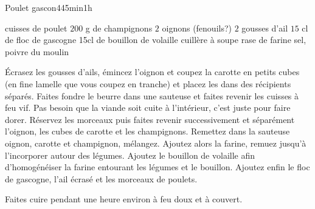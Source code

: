 \begin{recette}{Poulet gascon}{4}{45min}{1h}

\begin{ingredients}
 cuisses de poulet
\ingredient $200$ g de champignons
\ingredient $2$ oignons (fenouils?)
\ingredient $2$ gousses d'ail
\ingredient $15$ cl de floc de gascogne
\ingredient 15cl de bouillon de volaille
 cuillère à soupe rase de farine
\ingredient sel, poivre du moulin
\end{ingredients}

\begin{preparation}
\etape Écrasez les gousses d'ails, émincez l'oignon et coupez la carotte en petits cubes (en fine lamelle que vous coupez en tranche) et placez les dans des récipients séparés.
\etape Faites fondre le beurre dans une sauteuse et faites revenir les cuisses à feu vif. Pas besoin que la viande soit cuite à l'intérieur, c'est juste pour faire dorer.
\etape Réservez les morceaux puis faites revenir successivement et séparément l'oignon, les cubes de carotte et les champignons.
\etape Remettez dans la sauteuse oignon, carotte et champignon, mélangez.
\etape Ajoutez alors la farine, remuez jusqu'à l'incorporer autour des légumes.
\etape Ajoutez le bouillon de volaille afin d'homogénéiser la farine entourant les légumes et le bouillon.
\etape Ajoutez enfin le floc de gascogne, l'ail écrasé et les morceaux de poulets.
\end{preparation}

\begin{cuisson}
Faites cuire pendant une heure environ à feu doux et à couvert.
\end{cuisson}

\end{recette}

